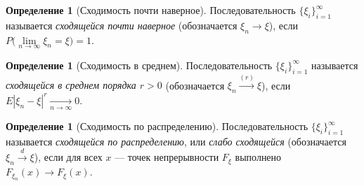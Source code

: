 \documentclass[11pt,openany,a4paper]{scrartcl}
\theoremstyle{plain}
\theoremstyle{definition}
\newtheorem{definition}[theorem]{Определение}
\newcommand{\underto}[1]{\xrightarrow[#1]{}}
\newcommand{\overto}[1]{\xrightarrow{#1}}
\begin{document}
\begin{definition}[Сходимость почти наверное]\label{almost_convergence}
    Последовательность $\{\xi_i\}_{i = 1}^\infty$ называется 
    \emph{сходящейся почти наверное} (обозначается $\xi_n \to \xi$), если
    $P\Big(\lim\limits_{n \to \infty} \xi_n = \xi\Big) = 1$.
\end{definition}

\begin{definition}[Сходимость в среднем]\label{convergence_in_average}
    Последовательность $\{\xi_i\}_{i = 1}^\infty$ называется 
    \emph{сходящейся в среднем порядка $r > 0$}
    (обозначается $\xi_n \overto{(r)} \xi$), если
    $E|\xi_n - \xi|^r \underto{n \to \infty} 0$.
\end{definition}

\begin{definition}[Сходимость по распределению]\label{distribution_convergence}
    Последовательность $\{\xi_i\}_{i = 1}^\infty$ называется 
    \emph{сходящейся по распределению}, или \emph{слабо сходящейся}
    (обозначается $\xi_n \overto{d} \xi$), если
    для всех $x$ — точек непрерывности $F_\xi$ выполнено
    $F_{\xi_n}(x) \to F_\xi (x)$.
\end{definition}
\end{document}
